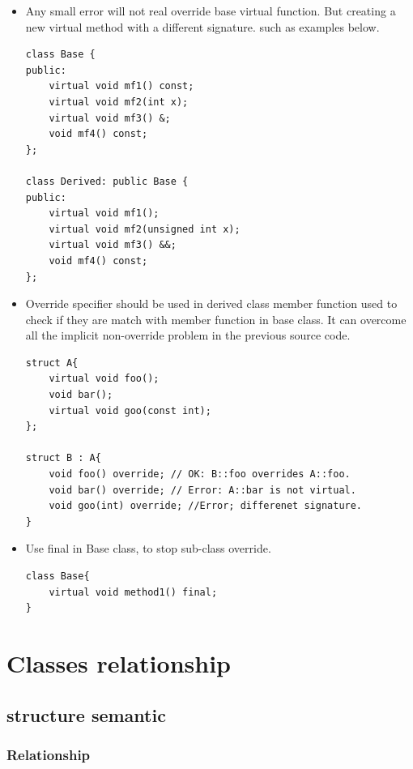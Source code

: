 \documentclass[a4paper,11pt,twoside]{book}
\begin{document}
\begin{itemize}
\item Any small error will not real override base virtual function. But creating a new virtual method with a different signature. such as examples below.

\begin{lstlisting}[numbers=none]
class Base {
public:
	virtual void mf1() const;
	virtual void mf2(int x);
	virtual void mf3() &;
	void mf4() const;
};

class Derived: public Base {
public:
	virtual void mf1();
	virtual void mf2(unsigned int x);
	virtual void mf3() &&;
	void mf4() const;
};
\end{lstlisting}
	
	\item Override specifier should be used in derived class member function used to check if they are match with member function in base class. It can overcome all the implicit non-override problem in the previous source code.
\begin{lstlisting}[numbers=none]
struct A{
	virtual void foo();
	void bar();
	virtual void goo(const int);
};
	
struct B : A{
	void foo() override; // OK: B::foo overrides A::foo.
	void bar() override; // Error: A::bar is not virtual.
	void goo(int) override; //Error; differenet signature. 
}
\end{lstlisting}
	
    \item Use final in Base class, to stop sub-class override.
\begin{lstlisting}[numbers=none]
class Base{
	virtual void method1() final;
}
\end{lstlisting}
	
\end{itemize}

\section{Classes relationship}

\subsection{structure semantic}

\subsubsection{Relationship}
\end{document}
